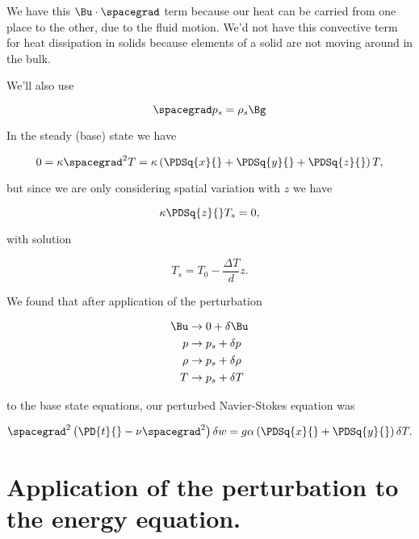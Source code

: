 We have this $\Bu \cdot \spacegrad$ term because our heat can be carried from one place to the other, due to the fluid motion.  We'd not have this convective term for heat dissipation in solids because elements of a solid are not moving around in the bulk.

We'll also use 

\begin{equation}\label{eqn:continuumL22:70}
\spacegrad p_s = \rho_s \Bg
\end{equation}

In the steady (base) state we have

\begin{equation}\label{eqn:continuumL22:90}
0 = \kappa \spacegrad^2 T = 
\kappa \left( 
\PDSq{x}{}
+\PDSq{y}{}
+\PDSq{z}{} \right) T,
\end{equation}

but since we are only considering spatial variation with $z$ we have

\begin{equation}\label{eqn:continuumL22:110}
\kappa \PDSq{z}{} T_s = 0,
\end{equation}

with solution

\begin{equation}\label{eqn:continuumL22:130}
T_s = T_0 - \frac{\Delta T}{d} z.
\end{equation}

We found that after application of the perturbation

\begin{align}\label{eqn:continuumL22:150}
\Bu &\rightarrow 0 + \delta \Bu \\
p &\rightarrow p_s + \delta p \\
\rho &\rightarrow p_s + \delta \rho \\
T &\rightarrow p_s + \delta T
\end{align}

to the base state equations, our perturbed Navier-Stokes equation was

\begin{equation}\label{eqn:continuumL22:170}
\spacegrad^2 \left( \PD{t}{} - \nu \spacegrad^2 \right) \delta w = g \alpha 
\left(
\PDSq{x}{}
+\PDSq{y}{}
\right)
\delta T.
\end{equation}

\section{Application of the perturbation to the energy equation.}

